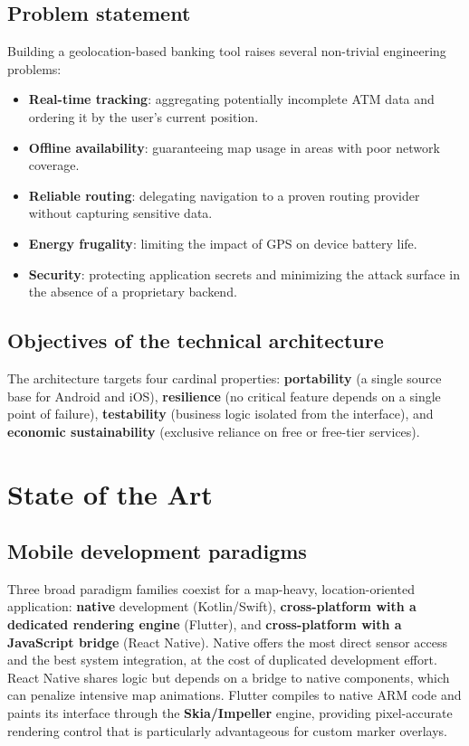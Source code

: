 \documentclass[11pt,a4paper]{article}
\begin{document}
\subsection{Problem statement}
Building a geolocation-based banking tool raises several non-trivial engineering
problems:
\begin{itemize}[leftmargin=1.4em]
  \item \textbf{Real-time tracking}: aggregating potentially incomplete ATM data
  and ordering it by the user's current position.
  \item \textbf{Offline availability}: guaranteeing map usage in areas with poor
  network coverage.
  \item \textbf{Reliable routing}: delegating navigation to a proven routing
  provider without capturing sensitive data.
  \item \textbf{Energy frugality}: limiting the impact of GPS on device battery
  life.
  \item \textbf{Security}: protecting application secrets and minimizing the
  attack surface in the absence of a proprietary backend.
\end{itemize}

\subsection{Objectives of the technical architecture}
The architecture targets four cardinal properties: \textbf{portability} (a single
source base for Android and iOS), \textbf{resilience} (no critical feature
depends on a single point of failure), \textbf{testability} (business logic
isolated from the interface), and \textbf{economic sustainability} (exclusive
reliance on free or free-tier services).

\section{State of the Art}
\subsection{Mobile development paradigms}
Three broad paradigm families coexist for a map-heavy, location-oriented
application: \textbf{native} development (Kotlin/Swift), \textbf{cross-platform
with a dedicated rendering engine} (Flutter), and \textbf{cross-platform with a
JavaScript bridge} (React Native). Native offers the most direct sensor access
and the best system integration, at the cost of duplicated development effort.
React Native shares logic but depends on a bridge to native components, which can
penalize intensive map animations. Flutter compiles to native ARM code and
paints its interface through the \textbf{Skia/Impeller} engine, providing
pixel-accurate rendering control that is particularly advantageous for custom
marker overlays.
\end{document}
